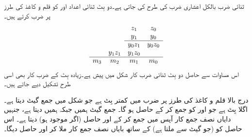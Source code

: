 ثنائی ضرب بالکل اعشاری ضرب کی طرح کی جاتی ہے۔دو بِٹ ثنائی اعداد  اور  کو قلم و کاغذ کی طرز پر ضرب کرتے ہیں۔
\begin{align*}
\begin{array}{cccc}
&& z_1&z_0\\
&& y_1&y_0\\
\cline{3-4}
&& y_0z_1&y_0z_0\\
&y_1z_1&y_1z_0&\\
\cline{1-4}
m_3&m_2&m_1&m_0
\end{array}
\end{align*}
اس مساوات سے حاصل دو بِٹ ثنائی ضرب کار شکل  میں پیش ہے۔زیادہ بِٹ کے ضرب کار بھی اسی طرح تشکیل دیے جاتے ہیں۔

 درج بالا قلم و کاغذ کی طرز پر ضرب میں کمتر بِٹ  ہے جو شکل میں جمع گیٹ  دیتا ہے۔ اگلا بِٹ  ہے جو  اور  کو جمع کر کے حاصل ہو گا۔ جمع گیٹ  ہمیں  جبکہ  ہمیں  دیتا ہے، جنہیں دایاں نصف جمع کار  آپس میں جمع کر کے  اور حاصل (اگر موجود ہو) دیتا ہے۔ اس حاصل کو  (جو گیٹ  سے ملتا ہے) کے ساتھ بایاں نصف جمع کار  ملا کر  اور حاصل  دیگا۔ 
